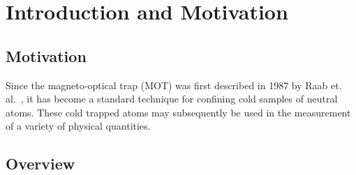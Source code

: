 
%
\chapter{Introduction and Motivation}
\label{IntroductionChapter}
\section{Motivation}
\label{motivation}
Since the magneto-optical trap (MOT) was first described in 1987 by Raab et. al.~\cite{raab}, it has become a standard technique for confining cold samples of neutral atoms.  These cold trapped atoms may subsequently be used in the measurement of a variety of physical quantities.  

\section{Overview}
\label{overview}

%
%
%
%



%
%
